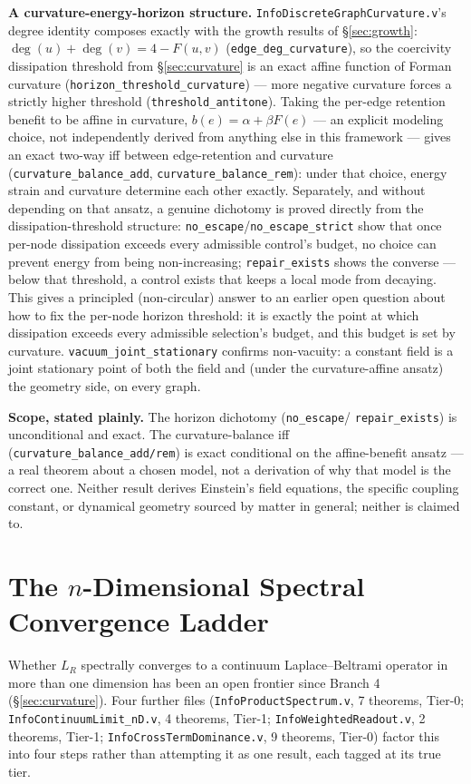 \documentclass[10pt,twocolumn]{article}
\begin{document}
\textbf{A curvature-energy-horizon structure.} \texttt{InfoDiscreteGraphCurvature.v}'s
degree identity composes exactly with the growth results of \S\ref{sec:growth}:
$\deg(u)+\deg(v) = 4-F(u,v)$ (\texttt{edge\_deg\_curvature}), so the coercivity
dissipation threshold from \S\ref{sec:curvature} is an exact affine function of
Forman curvature (\texttt{horizon\_threshold\_curvature}) --- more negative
curvature forces a strictly higher threshold (\texttt{threshold\_antitone}). Taking
the per-edge retention benefit to be affine in curvature, $b(e)=\alpha+\beta F(e)$
--- an explicit modeling choice, not independently derived from anything else in
this framework --- gives an exact two-way iff between edge-retention and curvature
(\texttt{curvature\_balance\_add}, \texttt{curvature\_balance\_rem}): under that
choice, energy strain and curvature determine each other exactly. Separately, and
without depending on that ansatz, a genuine dichotomy is proved directly from the
dissipation-threshold structure: \texttt{no\_escape}/\texttt{no\_escape\_strict}
show that once per-node dissipation exceeds every admissible control's budget, no
choice can prevent energy from being non-increasing; \texttt{repair\_exists} shows
the converse --- below that threshold, a control exists that keeps a local mode
from decaying. This gives a principled (non-circular) answer to an earlier open
question about how to fix the per-node horizon threshold: it is exactly the point
at which dissipation exceeds every admissible selection's budget, and this budget
is set by curvature. \texttt{vacuum\_joint\_stationary} confirms non-vacuity: a
constant field is a joint stationary point of both the field and (under the
curvature-affine ansatz) the geometry side, on every graph.

\textbf{Scope, stated plainly.} The horizon dichotomy (\texttt{no\_escape}/
\texttt{repair\_exists}) is unconditional and exact. The curvature-balance iff
(\texttt{curvature\_balance\_add/rem}) is exact conditional on the affine-benefit
ansatz --- a real theorem about a chosen model, not a derivation of why that model
is the correct one. Neither result derives Einstein's field equations, the
specific coupling constant, or dynamical geometry sourced by matter in general;
neither is claimed to.

\section{The $n$-Dimensional Spectral Convergence Ladder}
\label{sec:nd}
Whether $L_R$ spectrally converges to a continuum Laplace--Beltrami operator in
more than one dimension has been an open frontier since Branch 4
(\S\ref{sec:curvature}). Four further files (\texttt{InfoProductSpectrum.v}, 7
theorems, Tier-0; \texttt{InfoContinuumLimit\_nD.v}, 4 theorems, Tier-1;
\texttt{InfoWeightedReadout.v}, 2 theorems, Tier-1; \texttt{InfoCrossTermDominance.v},
9 theorems, Tier-0) factor this into four steps rather than attempting it as one
result, each tagged at its true tier.
\end{document}
